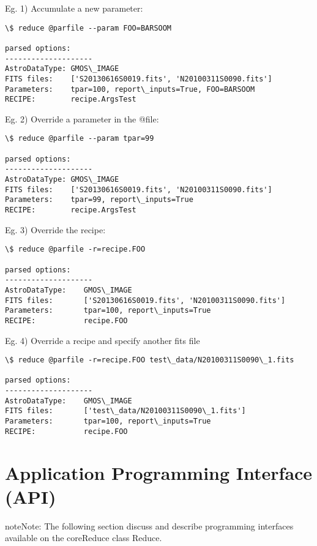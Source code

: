 \documentclass[letterpaper,10pt,english]{sphinxmanual}
\begin{document}
Eg. 1)  Accumulate a new parameter:

\begin{Verbatim}[commandchars=\\\{\}]
\$ reduce @parfile --param FOO=BARSOOM

parsed options:
--------------------
AstroDataType: GMOS\_IMAGE
FITS files:    ['S20130616S0019.fits', 'N20100311S0090.fits']
Parameters:    tpar=100, report\_inputs=True, FOO=BARSOOM
RECIPE:        recipe.ArgsTest
\end{Verbatim}

Eg. 2) Override a parameter in the @file:

\begin{Verbatim}[commandchars=\\\{\}]
\$ reduce @parfile --param tpar=99

parsed options:
--------------------
AstroDataType: GMOS\_IMAGE
FITS files:    ['S20130616S0019.fits', 'N20100311S0090.fits']
Parameters:    tpar=99, report\_inputs=True
RECIPE:        recipe.ArgsTest
\end{Verbatim}

Eg. 3) Override the recipe:

\begin{Verbatim}[commandchars=\\\{\}]
\$ reduce @parfile -r=recipe.FOO

parsed options:
--------------------
AstroDataType:    GMOS\_IMAGE
FITS files:       ['S20130616S0019.fits', 'N20100311S0090.fits']
Parameters:       tpar=100, report\_inputs=True
RECIPE:           recipe.FOO
\end{Verbatim}

Eg. 4) Override a recipe and specify another fits file

\begin{Verbatim}[commandchars=\\\{\}]
\$ reduce @parfile -r=recipe.FOO test\_data/N20100311S0090\_1.fits

parsed options:
--------------------
AstroDataType:    GMOS\_IMAGE
FITS files:       ['test\_data/N20100311S0090\_1.fits']
Parameters:       tpar=100, report\_inputs=True
RECIPE:           recipe.FOO
\end{Verbatim}


\section{Application Programming Interface (API)}
\label{interfaces:application-programming-interface-api}
\begin{notice}{note}{Note:}
The following section discuss and describe programming interfaces
available on the coreReduce class Reduce.
\end{notice}
\end{document}
